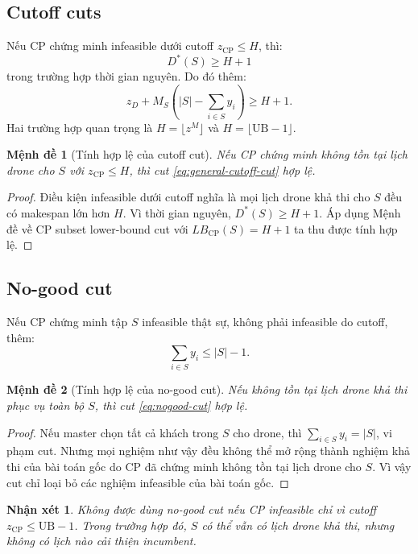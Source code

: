 \documentclass[12pt,a4paper]{article}
\newtheorem{proposition}{Mệnh đề}
\newtheorem{remark}{Nhận xét}
\newcommand{\UB}{\mathrm{UB}}
\begin{document}
\subsection{Cutoff cuts}

Nếu CP chứng minh infeasible dưới cutoff $z_{\mathrm{CP}}\le H$, thì:
\[
    D^*(S)\ge H+1
\]
trong trường hợp thời gian nguyên. Do đó thêm:
\begin{equation}
    z_D+M_S\left(|S|-\sum_{i\in S}y_i\right)
    \ge H+1.
    \label{eq:general-cutoff-cut}
\end{equation}
Hai trường hợp quan trọng là $H=\lfloor z^M\rfloor$ và $H=\lfloor \UB-1\rfloor$.

\begin{proposition}[Tính hợp lệ của cutoff cut]
Nếu CP chứng minh không tồn tại lịch drone cho $S$ với $z_{\mathrm{CP}}\le H$, thì cut \eqref{eq:general-cutoff-cut} hợp lệ.
\end{proposition}
\begin{proof}
Điều kiện infeasible dưới cutoff nghĩa là mọi lịch drone khả thi cho $S$ đều có makespan lớn hơn $H$. Vì thời gian nguyên, $D^*(S)\ge H+1$. Áp dụng Mệnh đề về CP subset lower-bound cut với $LB_{\mathrm{CP}}(S)=H+1$ ta thu được tính hợp lệ.
\end{proof}

\subsection{No-good cut}

Nếu CP chứng minh tập $S$ infeasible thật sự, không phải infeasible do cutoff, thêm:
\begin{equation}
    \sum_{i\in S}y_i\le |S|-1.
    \label{eq:nogood-cut}
\end{equation}

\begin{proposition}[Tính hợp lệ của no-good cut]
Nếu không tồn tại lịch drone khả thi phục vụ toàn bộ $S$, thì cut \eqref{eq:nogood-cut} hợp lệ.
\end{proposition}
\begin{proof}
Nếu master chọn tất cả khách trong $S$ cho drone, thì $\sum_{i\in S}y_i=|S|$, vi phạm cut. Nhưng mọi nghiệm như vậy đều không thể mở rộng thành nghiệm khả thi của bài toán gốc do CP đã chứng minh không tồn tại lịch drone cho $S$. Vì vậy cut chỉ loại bỏ các nghiệm infeasible của bài toán gốc.
\end{proof}

\begin{remark}
Không được dùng no-good cut nếu CP infeasible chỉ vì cutoff $z_{\mathrm{CP}}\le \UB-1$. Trong trường hợp đó, $S$ có thể vẫn có lịch drone khả thi, nhưng không có lịch nào cải thiện incumbent.
\end{remark}
\end{document}
